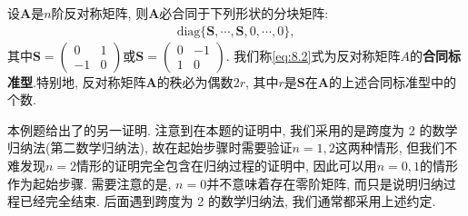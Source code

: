 \documentclass[../../main.tex]{subfiles}%
\begin{document}
\begin{theorem}[反对称矩阵的合同标准型]\label{theorem:反对称矩阵的合同标准型}
设$\boldsymbol{A}$是$n$阶反对称矩阵, 则$\boldsymbol{A}$必合同于下列形状的分块矩阵:
\begin{align}
\text{diag}\{\boldsymbol{S}, \cdots, \boldsymbol{S}, 0, \cdots, 0\}, \label{eq:8.2}
\end{align}
其中$\boldsymbol{S}=\begin{pmatrix}
0 & 1 \\
-1 & 0
\end{pmatrix}$或$\boldsymbol{S}=\begin{pmatrix}
0 & -1 \\
1 & 0
\end{pmatrix}$. 我们称\eqref{eq:8.2}式为反对称矩阵$A$的\textbf{合同标准型}.特别地, 反对称矩阵$\boldsymbol{A}$的秩必为偶数$2r$, 其中$r$是$\boldsymbol{S}$在$\boldsymbol{A}$的上述合同标准型中的个数.
\end{theorem}
\begin{remark}
本例题给出了的另一证明. 注意到在本题的证明中, 我们采用的是跨度为 2 的数学归纳法(第二数学归纳法), 故在起始步骤时需要验证$n = 1, 2$这两种情形, 但我们不难发现$n = 2$情形的证明完全包含在归纳过程的证明中, 因此可以用$n = 0, 1$的情形作为起始步骤. 需要注意的是, $n = 0$并不意味着存在零阶矩阵, 而只是说明归纳过程已经完全结束. 后面遇到跨度为 2 的数学归纳法, 我们通常都采用上述约定. 
\end{remark}
\end{document}
